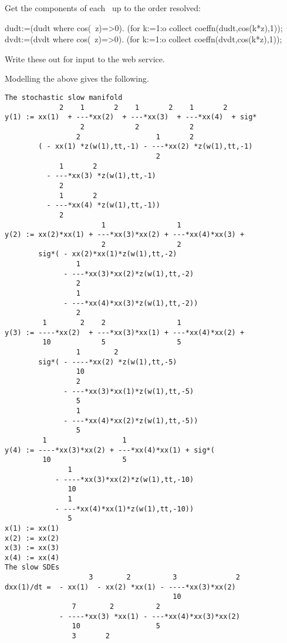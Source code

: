 \documentclass[11pt,a5paper]{article}
\begin{document}
Get the components of each \pde\ up to the order resolved:
\begin{reduce}
dudt:=(dudt where cos(~z)=>0).
    (for k:=1:o collect coeffn(dudt,cos(k*z),1));
dvdt:=(dvdt where cos(~z)=>0).
    (for k:=1:o collect coeffn(dvdt,cos(k*z),1));
\end{reduce}

Write these out for input to the web service.

Modelling the above gives the following.
\begin{verbatim}
The stochastic slow manifold
             2    1       2    1       2    1       2
y(1) := xx(1)  + ---*xx(2)  + ---*xx(3)  + ---*xx(4)  + sig*
                  2            2            2
                 2                  1       2
        ( - xx(1) *z(w(1),tt,-1) - ---*xx(2) *z(w(1),tt,-1)
                                    2
             1       2
          - ---*xx(3) *z(w(1),tt,-1)
             2
             1       2
          - ---*xx(4) *z(w(1),tt,-1))
             2
                       1                 1
y(2) := xx(2)*xx(1) + ---*xx(3)*xx(2) + ---*xx(4)*xx(3) + 
                       2                 2
        sig*( - xx(2)*xx(1)*z(w(1),tt,-2)
                 1
              - ---*xx(3)*xx(2)*z(w(1),tt,-2)
                 2
                 1
              - ---*xx(4)*xx(3)*z(w(1),tt,-2))
                 2
         1        2    2                 1
y(3) := ----*xx(2)  + ---*xx(3)*xx(1) + ---*xx(4)*xx(2) + 
         10            5                 5
                 1        2
        sig*( - ----*xx(2) *z(w(1),tt,-5)
                 10
                 2
              - ---*xx(3)*xx(1)*z(w(1),tt,-5)
                 5
                 1
              - ---*xx(4)*xx(2)*z(w(1),tt,-5))
                 5
         1                  1
y(4) := ----*xx(3)*xx(2) + ---*xx(4)*xx(1) + sig*(
         10                 5
               1
            - ----*xx(3)*xx(2)*z(w(1),tt,-10)
               10
               1
            - ---*xx(4)*xx(1)*z(w(1),tt,-10))
               5
x(1) := xx(1)
x(2) := xx(2)
x(3) := xx(3)
x(4) := xx(4)
The slow SDEs
                    3        2          3              2
dxx(1)/dt =  - xx(1)  - xx(2) *xx(1) - ----*xx(3)*xx(2)
                                        10
                7        2          2
             - ----*xx(3) *xx(1) - ---*xx(4)*xx(3)*xx(2)
                10                  5
                3       2

\end{verbatim}
\end{document}
